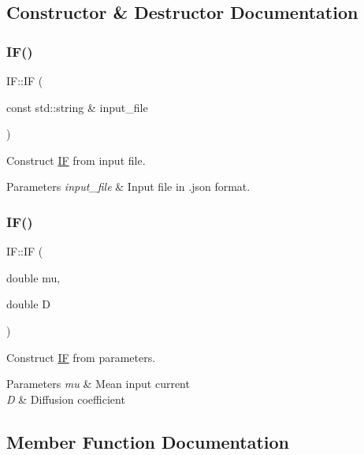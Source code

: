 \subsection{Constructor \& Destructor Documentation}
\mbox{\label{classIF_a2db11718c548d0c8afabdd1dc96c3b7e}} 
\subsubsection{\texorpdfstring{I\+F()}{IF()}\hspace{0.1cm}{\footnotesize\ttfamily [1/2]}}
{\footnotesize\ttfamily I\+F\+::\+IF (\begin{DoxyParamCaption}\item[{const std\+::string \&}]{input\+\_\+file }\end{DoxyParamCaption})}



Construct \hyperlink{classIF}{IF} from input file. 


\begin{DoxyParams}{Parameters}
{\em input\+\_\+file} & Input file in .json format. \\
\hline
\end{DoxyParams}
\mbox{\label{classIF_a965019357edab5848988178828ceaa40}} 
\subsubsection{\texorpdfstring{I\+F()}{IF()}\hspace{0.1cm}{\footnotesize\ttfamily [2/2]}}
{\footnotesize\ttfamily I\+F\+::\+IF (\begin{DoxyParamCaption}\item[{double}]{mu,  }\item[{double}]{D }\end{DoxyParamCaption})}



Construct \hyperlink{classIF}{IF} from parameters. 


\begin{DoxyParams}{Parameters}
{\em mu} & Mean input current \\
\hline
{\em D} & Diffusion coefficient \\
\hline
\end{DoxyParams}


\subsection{Member Function Documentation}
\mbox{\label{classIF_a37f5085087483968fe31a69589c3dd66}} 
